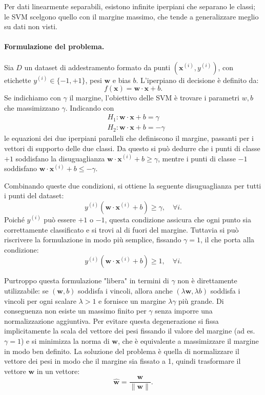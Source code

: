 Per dati linearmente separabili, esistono infinite iperpiani che separano le classi; le SVM scelgono quello con il margine massimo, che tende a generalizzare meglio su dati non visti.

\paragraph{Formulazione del problema.}
Sia $D$ un dataset di addestramento formato da punti \((\mathbf{x}^{(i)},y^{(i)})\), con etichette \(y^{(i)} \in \{-1,+1\}\), pesi \(\mathbf{w}\) e bias \(b\). L'iperpiano di decisione è definito da:
\[
f(\mathbf{x}) = \mathbf{w} \cdot \mathbf{x} + b.
\]
Se indichiamo con $\gamma$ il margine, l'obiettivo delle SVM è trovare i parametri $w, b$ che massimizzano $\gamma$. Indicando con
\begin{align*}
  &H_1: \mathbf{w} \cdot \mathbf{x} + b = \gamma \\
  &H_2: \mathbf{w} \cdot \mathbf{x} + b = -\gamma
\end{align*}
le equazioni dei due iperpiani paralleli che definiscono il margine, passanti per i vettori di supporto delle due classi. Da questo si può dedurre che i punti di classe $+1$ soddisfano la disuguaglianza \(\mathbf{w} \cdot \mathbf{x}^{(i)} + b \geq \gamma\), mentre i punti di classe $-1$ soddisfano \(\mathbf{w} \cdot \mathbf{x}^{(i)} + b \leq -\gamma\). 

Combinando queste due condizioni, si ottiene la seguente disuguaglianza per tutti i punti del dataset:
\[
y^{(i)}(\mathbf{w} \cdot \mathbf{x}^{(i)} + b) \geq \gamma, \quad \forall i.
\]
Poiché $y^{(i)}$ può essere $+1$ o $-1$, questa condizione assicura che ogni punto sia correttamente classificato e si trovi al di fuori del margine. Tuttavia si può riscrivere la formulazione in modo più semplice, fissando \(\gamma = 1\), il che porta alla condizione:
\[
y^{(i)}(\mathbf{w} \cdot \mathbf{x}^{(i)} + b) \geq 1, \quad \forall i.
\]

Purtroppo questa formulazione "libera" in termini di $\gamma$ non è direttamente utilizzabile: se $(\mathbf{w},b)$ soddisfa i vincoli, allora anche $(\lambda\mathbf{w},\lambda b)$ soddisfa i vincoli per ogni scalare $\lambda>1$ e fornisce un margine $\lambda\gamma$ più grande. Di conseguenza non esiste un massimo finito per $\gamma$ senza imporre una normalizzazione aggiuntiva. Per evitare questa degenerazione si fissa implicitamente la scala del vettore dei pesi fissando il valore del margine (ad es. $\gamma=1$) e si minimizza la norma di $\mathbf{w}$, che è equivalente a massimizzare il margine in modo ben definito. La soluzione del problema è quella di normalizzare il vettore dei pesi in modo che il margine sia fissato a 1, quindi trasformare il vettore $\mathbf{w}$ in un vettore:
\[
\hat{\mathbf{w}} = \frac{\mathbf{w}}{\|\mathbf{w}\|}.
\]

